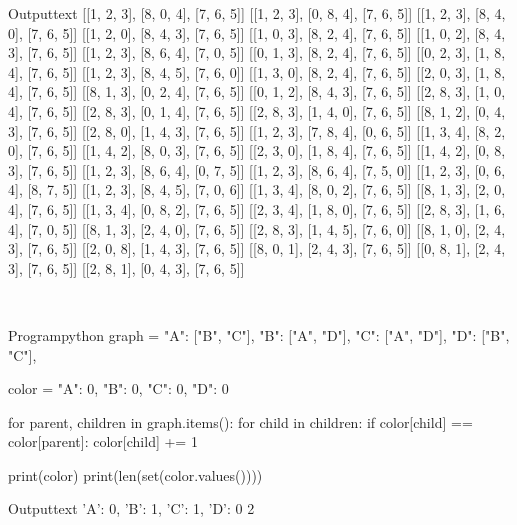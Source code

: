 \documentclass[11pt]{ipu-python}
\begin{document}
    \begin{code}
        {Output}{text}
[[1, 2, 3], [8, 0, 4], [7, 6, 5]]
[[1, 2, 3], [0, 8, 4], [7, 6, 5]]
[[1, 2, 3], [8, 4, 0], [7, 6, 5]]
[[1, 2, 0], [8, 4, 3], [7, 6, 5]]
[[1, 0, 3], [8, 2, 4], [7, 6, 5]]
[[1, 0, 2], [8, 4, 3], [7, 6, 5]]
[[1, 2, 3], [8, 6, 4], [7, 0, 5]]
[[0, 1, 3], [8, 2, 4], [7, 6, 5]]
[[0, 2, 3], [1, 8, 4], [7, 6, 5]]
[[1, 2, 3], [8, 4, 5], [7, 6, 0]]
[[1, 3, 0], [8, 2, 4], [7, 6, 5]]
[[2, 0, 3], [1, 8, 4], [7, 6, 5]]
[[8, 1, 3], [0, 2, 4], [7, 6, 5]]
[[0, 1, 2], [8, 4, 3], [7, 6, 5]]
[[2, 8, 3], [1, 0, 4], [7, 6, 5]]
[[2, 8, 3], [0, 1, 4], [7, 6, 5]]
[[2, 8, 3], [1, 4, 0], [7, 6, 5]]
[[8, 1, 2], [0, 4, 3], [7, 6, 5]]
[[2, 8, 0], [1, 4, 3], [7, 6, 5]]
[[1, 2, 3], [7, 8, 4], [0, 6, 5]]
[[1, 3, 4], [8, 2, 0], [7, 6, 5]]
[[1, 4, 2], [8, 0, 3], [7, 6, 5]]
[[2, 3, 0], [1, 8, 4], [7, 6, 5]]
[[1, 4, 2], [0, 8, 3], [7, 6, 5]]
[[1, 2, 3], [8, 6, 4], [0, 7, 5]]
[[1, 2, 3], [8, 6, 4], [7, 5, 0]]
[[1, 2, 3], [0, 6, 4], [8, 7, 5]]
[[1, 2, 3], [8, 4, 5], [7, 0, 6]]
[[1, 3, 4], [8, 0, 2], [7, 6, 5]]
[[8, 1, 3], [2, 0, 4], [7, 6, 5]]
[[1, 3, 4], [0, 8, 2], [7, 6, 5]]
[[2, 3, 4], [1, 8, 0], [7, 6, 5]]
[[2, 8, 3], [1, 6, 4], [7, 0, 5]]
[[8, 1, 3], [2, 4, 0], [7, 6, 5]]
[[2, 8, 3], [1, 4, 5], [7, 6, 0]]
[[8, 1, 0], [2, 4, 3], [7, 6, 5]]
[[2, 0, 8], [1, 4, 3], [7, 6, 5]]
[[8, 0, 1], [2, 4, 3], [7, 6, 5]]
[[0, 8, 1], [2, 4, 3], [7, 6, 5]]
[[2, 8, 1], [0, 4, 3], [7, 6, 5]]
    \end{code}

    \vspace*{15pt}
    \vspace*{-30pt}%
    \begin{center}%
    \end{center}~\\%
    \begin{code}
        {Program}{python}
graph = {
    "A": ["B", "C"],
    "B": ["A", "D"],
    "C": ["A", "D"],
    "D": ["B", "C"],
}

color = {
    "A": 0,
    "B": 0,
    "C": 0,
    "D": 0
}

for parent, children in graph.items():
    for child in children:
        if color[child] == color[parent]:
            color[child] += 1

print(color)
print(len(set(color.values())))
    \end{code}
    \begin{code}
        {Output}{text}
{'A': 0, 'B': 1, 'C': 1, 'D': 0}
2
    \end{code}
\end{document}

